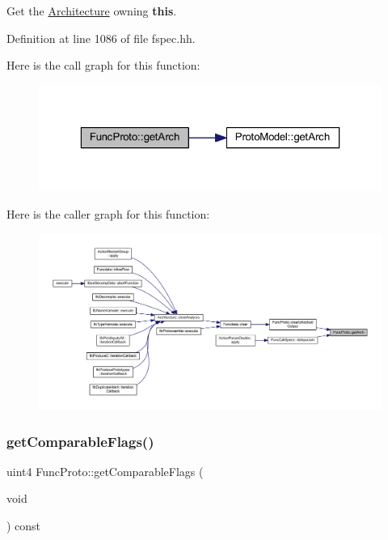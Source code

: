 Get the \mbox{\hyperlink{class_architecture}{Architecture}} owning {\bfseries{this}}. 



Definition at line 1086 of file fspec.\+hh.

Here is the call graph for this function\+:
\nopagebreak
\begin{figure}[H]
\begin{center}
\leavevmode
\includegraphics[width=323pt]{class_func_proto_ac21659d866e78bb27aca67f1cb2df390_cgraph}
\end{center}
\end{figure}
Here is the caller graph for this function\+:
\nopagebreak
\begin{figure}[H]
\begin{center}
\leavevmode
\includegraphics[width=350pt]{class_func_proto_ac21659d866e78bb27aca67f1cb2df390_icgraph}
\end{center}
\end{figure}
\mbox{\label{class_func_proto_aeb1c9aa013921f2738ad28dce59867e6}} 
\subsubsection{\texorpdfstring{getComparableFlags()}{getComparableFlags()}}
{\footnotesize\ttfamily uint4 Func\+Proto\+::get\+Comparable\+Flags (\begin{DoxyParamCaption}\item[{void}]{ }\end{DoxyParamCaption}) const\hspace{0.3cm}{\ttfamily [inline]}}




